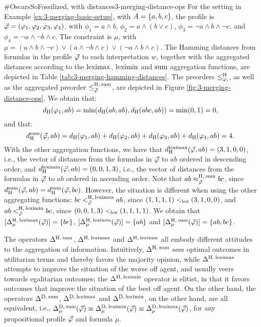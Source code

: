 \begin{xmpl}{$\#$OscarsSoFossilized, with distances}{3-merging-distance-ops}
	For the setting in Example \ref{ex:3-merging-basic-setup},
	with $\Atoms=\{a,b,c\}$,
	the profile is $\P=(\phi_{1},\phi_{2}, \phi_{3}, \phi_{4})$,
	with
	$\phi_1 = a\land b$,
	$\phi_2 = a\land (b\lor c)$,
	$\phi_3 = \lnot a\land b \land \lnot c$.
	and
	$\phi_4 = \lnot a \land\lnot b\land c$.
	The constraint is $\mu$, 
	with
	$\mu=(a\land b\land \lnot c)\lor (a\land\lnot b\land c)\lor(\lnot a\land b\land c)$.
	The Hamming distances from formulas in the profile $\P$ to each interpretation $w$,
	together with the aggregated distances according to the $\leximax$, $\leximin$
	and $\ssum$ aggregation functions, 
	are depicted in Table \ref{tab:3-merging-hamming-distances}.
	The preorders $\le^{\hamming}_{\phi_{i}}$, as well as the aggregated preorder 
	$\le^{\hamming,\:\ssum}_{\P}$, are depicted in Figure \ref{fig:3-merging-distance-ops}.
	We obtain that:
	$$
		\dd_\hamming(\phi_1,ab)=\min(\dd_\hamming(ab,ab),\dd_\hamming(abc,ab))=\min(0,1)=0,
	$$
	and that:
	$$
		\dd^\ssum_\hamming(\P,ab) = \dd_{\hamming}(\phi_1,ab)+\dd_{\hamming}(\phi_2,ab)
		+\dd_{\hamming}(\phi_3,ab)+\dd_{\hamming}(\phi_4,ab) = 4.
	$$
	With the other aggregation functions, 
	we have that $\dd^\leximax_\hamming(\P,ab) = (3,1,0,0)$,
	i.e., the vector of distances from the formulas in $\P$ to $ab$ ordered in descending order,
	and $\dd^\leximin_\hamming(\P,ab) = (0,0,1,3)$,
	i.e., the vector of distances from the formulas in $\P$ to $ab$ ordered in ascending order.
	Note that 
	$ab \approx^{\hamming,\:\ssum}_{\P} bc$, since $\dd^\ssum_\hamming(\P,ab) = \dd^\ssum_\hamming(\P,bc)$.
	However, the situation is different when using the other aggregating functions:
	$bc <^{\hamming,\:\leximax}_{\P} ab$, since $(1,1,1,1)<_\lex(3,1,0,0)$,
	and $ab <^{\hamming,\:\leximin}_{\P} bc$, since $(0,0,1,3)<_\lex(1,1,1,1)$.
	We obtain that 
	$[\me^{\hamming,\:\leximax}_\mu(\P)]=\{bc\}$,
	$[\me^{\hamming,\:\leximin}_\mu(\P)]=\{ab\}$
	and
	$[\me^{\hamming,\:\ssum}_\mu(\P)]=\{ab,bc\}$.
\end{xmpl}

The operators 
$\me^{\hamming,\:\ssum}$,
$\me^{\hamming,\:\leximax}$
and 
$\me^{\hamming,\:\leximin}$
all embody different attitudes to the aggregation of information.
Intuitively, 
$\me^{\hamming,\:\ssum}$ sees optimal outcomes in utilitarian terms and thereby favors the majority opinion, 
while $\me^{\hamming,\:\leximax}$ attempts to improve the situation of the worse off agent, and usually veers towards egalitarian outcomes;
the $\me^{\hamming,\:\leximin}$ operator is elitist, in that it favors outcomes that improve the situation of the best off agent.
On the other hand, the operators 
$\me^{\drastic,\:\ssum}$, 
$\me^{\drastic,\:\leximax}$
and
$\me^{\drastic,\:\leximin}$,
on the other hand, are all equivalent, i.e., 
$\me^{\drastic,\:\ssum}_\mu(\P)\equiv\me^{\drastic,\:\leximin}_\mu(\P)\equiv\me^{\drastic,\:\leximax}_\mu(\P)$,
for any propositional profile $\P$ and formula $\mu$. 

